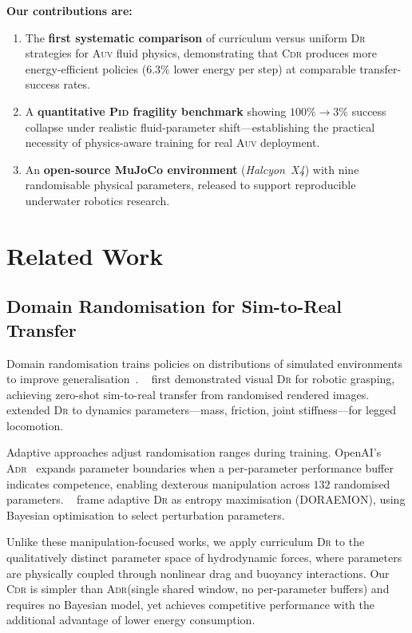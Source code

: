 \documentclass[letterpaper,10pt,journal]{IEEEtran}
\newcommand{\CDR}{\textsc{Cdr}\xspace}
\newcommand{\PID}{\textsc{Pid}\xspace}
\newcommand{\AUV}{\textsc{Auv}\xspace}
\newcommand{\DR}{\textsc{Dr}\xspace}
\newcommand{\ADR}{\textsc{Adr}\xspace}
\newcommand{\MuJoCo}{MuJoCo\xspace}
\begin{document}
\textbf{Our contributions are:}
\begin{enumerate}
  \item The \textbf{first systematic comparison} of curriculum versus
        uniform \DR strategies for \AUV fluid physics, demonstrating
        that \CDR produces more energy-efficient policies ($6.3\%$
        lower energy per step) at comparable transfer-success rates.
  \item A \textbf{quantitative \PID fragility benchmark} showing
        $100\%\to3\%$ success collapse under realistic fluid-parameter
        shift---establishing the practical necessity of physics-aware
        training for real \AUV deployment.
  \item An \textbf{open-source \MuJoCo environment} (\emph{Halcyon~X4})
        with nine randomisable physical parameters, released to support
        reproducible underwater robotics research.
\end{enumerate}

\section{Related Work}
\label{sec:related}

\subsection{Domain Randomisation for Sim-to-Real Transfer}

Domain randomisation trains policies on distributions of simulated
environments to improve generalisation~\cite{tobin2017}.
\citeauthor{tobin2017}~\cite{tobin2017} first demonstrated visual \DR
for robotic grasping, achieving zero-shot sim-to-real transfer from
randomised rendered images.
\citeauthor{peng2018}~\cite{peng2018} extended \DR to dynamics
parameters---mass, friction, joint stiffness---for legged locomotion.

Adaptive approaches adjust randomisation ranges during training.
OpenAI's \ADR~\cite{akkaya2019} expands parameter boundaries when
a per-parameter performance buffer indicates competence, enabling
dexterous manipulation across $132$ randomised parameters.
\citeauthor{tiboni2024}~\cite{tiboni2024} frame adaptive \DR as entropy
maximisation (DORAEMON), using Bayesian optimisation to select
perturbation parameters.

Unlike these manipulation-focused works, we apply curriculum \DR to the
qualitatively distinct parameter space of hydrodynamic forces, where
parameters are physically coupled through nonlinear drag and buoyancy
interactions.
Our \CDR is simpler than \ADR (single shared window, no per-parameter
buffers) and requires no Bayesian model, yet achieves competitive
performance with the additional advantage of lower energy consumption.
\end{document}
